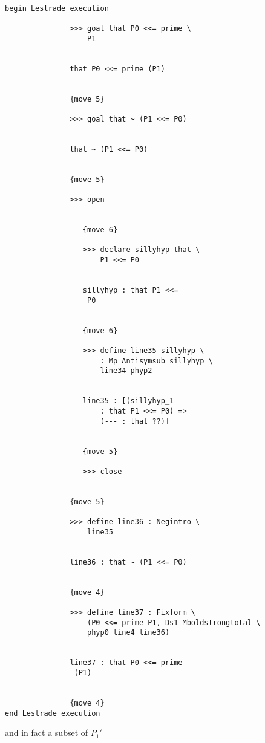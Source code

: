 \documentclass[12pt]{article}
\begin{document}
\begin{verbatim}

begin Lestrade execution

               >>> goal that P0 <<= prime \
                   P1


               that P0 <<= prime (P1)


               {move 5}

               >>> goal that ~ (P1 <<= P0)


               that ~ (P1 <<= P0)


               {move 5}

               >>> open


                  {move 6}

                  >>> declare sillyhyp that \
                      P1 <<= P0


                  sillyhyp : that P1 <<= 
                   P0


                  {move 6}

                  >>> define line35 sillyhyp \
                      : Mp Antisymsub sillyhyp \
                      line34 phyp2


                  line35 : [(sillyhyp_1 
                      : that P1 <<= P0) => 
                      (--- : that ??)]


                  {move 5}

                  >>> close


               {move 5}

               >>> define line36 : Negintro \
                   line35


               line36 : that ~ (P1 <<= P0)


               {move 4}

               >>> define line37 : Fixform \
                   (P0 <<= prime P1, Ds1 Mboldstrongtotal \
                   phyp0 line4 line36)


               line37 : that P0 <<= prime 
                (P1)


               {move 4}
end Lestrade execution
\end{verbatim}

and in fact a subset of $P_1'$
\end{document}
